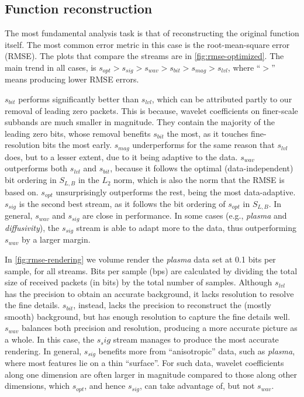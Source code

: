 \subsection{Function reconstruction}\label{sec:rmse-optimized}

The most fundamental analysis task is that of reconstructing the original function itself. The most
common error metric in this case is the root-mean-square error (RMSE). The plots that compare the
streams are in \autoref{fig:rmse-optimized}. The main trend in all cases, is $s_{opt} > s_{sig} >
s_{wav} > s_{bit} > s_{mag} > s_{lvl}$, where ``$>$'' means producing lower RMSE errors.

$s_{bit}$ performs significantly better than $s_{lvl}$, which can be attributed partly to our
removal of leading zero packets. This is because, wavelet coefficients on finer-scale subbands are
much smaller in magnitude. They contain the majority of the leading zero bits, whose removal
benefits $s_{bit}$ the most, as it touches fine-resolution bits the most early. $s_{mag}$
underperforms for the same reason that $s_{lvl}$ does, but to a lesser extent, due to it being
adaptive to the data. $s_{wav}$ outperforms both $s_{lvl}$ and $s_{bit}$, because it follows the
optimal (data-independent) bit ordering in $S_{L,B}$ in the $L_2$ norm, which is also the norm that
the RMSE is based on. $s_{opt}$ unsurprisingly outperforms the rest, being the most data-adaptive.
$s_{sig}$ is the second best stream, as it follows the bit ordering of $s_{opt}$ in $S_{L,B}$. In
general, $s_{wav}$ and $s_{sig}$ are close in performance. In some cases (e.g., \emph{plasma} and
\emph{diffusivity}), the $s_{sig}$ stream is able to adapt more to the data, thus outperforming
$s_{wav}$ by a larger margin.

In \autoref{fig:rmse-rendering} we volume render the \emph{plasma} data set at 0.1 bits per sample,
for all streams. Bits per sample (bps) are calculated by dividing the total size of received packets
(in bits) by the total number of samples. Although $s_{lvl}$ has the precision to obtain an accurate
background, it lacks resolution to resolve the fine details. $s_{bit}$, instead, lacks the precision
to reconstruct the (mostly smooth) background, but has enough resolution to capture the fine details
well. $s_{wav}$ balances both precision and resolution, producing a more accurate picture as a
whole. In this case, the $s_sig$ stream manages to produce the most accurate rendering. In general,
$s_{sig}$ benefits more from ``anisotropic'' data, such as \emph{plasma}, where most features lie on
a thin ``surface''. For such data, wavelet coefficients along one dimension are often larger in
magnitude compared to those along other dimensions, which $s_{opt}$, and hence $s_{sig}$, can take
advantage of, but not $s_{wav}$.

